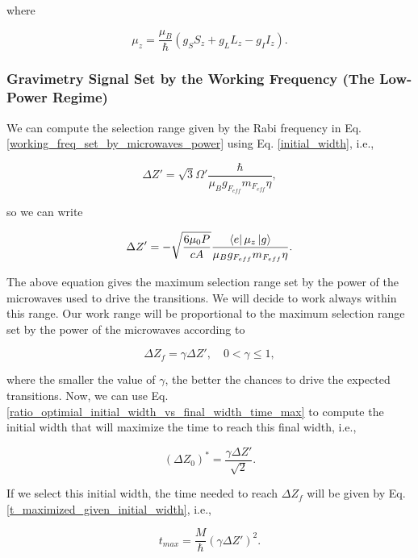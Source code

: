 \documentclass{article}
\begin{document}
where 

\begin{equation}
     \mu_{z} = \frac{\mu_{B}}{\hbar}(g_{S}S_{z} + g_{L}L_{z} - g_{I}I_{z}).
\end{equation}

\subsubsection{Gravimetry Signal Set by the Working Frequency (The Low-Power Regime)}
We can compute the selection range given by the Rabi frequency in Eq. \ref{working_freq_set_by_microwaves_power} using Eq. \ref{initial_width}, i.e.,

\begin{equation*}
\Delta Z' = \sqrt{3} \Omega' \frac{\hbar}{\mu_{B} g_{F_{eff}} m_{F_{eff}} \eta},
\end{equation*}

so we can write

\begin{equation}\label{maximum_selection_range}
\Delta Z' = - \sqrt{\frac{6 \mu_{0} P}{c A}} \frac{\bra{e} \mu_{z} \ket{g}}{\mu_{B} g_{F_{eff}} m_{F_{eff}} \eta}.
\end{equation}

The above equation gives the maximum selection range set by the power of the microwaves used to drive the transitions. We will decide to work always within this range. Our work range will be proportional to the maximum selection range set by the power of the microwaves according to

\begin{equation}
    \Delta Z_{f} = \gamma \Delta Z' \mathrm{,} \quad 0 < \gamma \leq 1,
\end{equation}

where the smaller the value of $\gamma$, the better the chances to drive the expected transitions. Now, we can use Eq. \ref{ratio_optimial_initial_width_vs_final_width_time_max} to compute the initial width that will maximize the time to reach this final width, i.e.,

\begin{equation}
    (\Delta Z_{0})^{\ast} = \frac{\gamma \Delta Z'}{\sqrt{2}}.
\end{equation}

If we select this initial width, the time needed to reach $\Delta Z_{f}$ will be given by Eq. \ref{t_maximized_given_initial_width}, i.e.,

\begin{equation}
    t_{max} = \frac{M}{\hbar} (\gamma \Delta Z')^2.
\end{equation}
\end{document}
